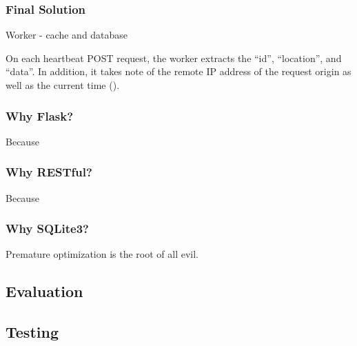 \documentclass{sigchi}
\begin{document}
\subsubsection{Final Solution}

Worker - cache and database

On each heartbeat POST request, the worker extracts the \enquote{id}, \enquote{location}, and \enquote{data}. In addition, it takes note of the remote IP address of the request origin as well as the current time ().

\subsubsection{Why Flask?}

Because

\subsubsection{Why RESTful?}

Because

\subsubsection{Why SQLite3?}

Premature optimization is the root of all evil.

\subsection{Evaluation}


\subsection{Testing}
\end{document}
